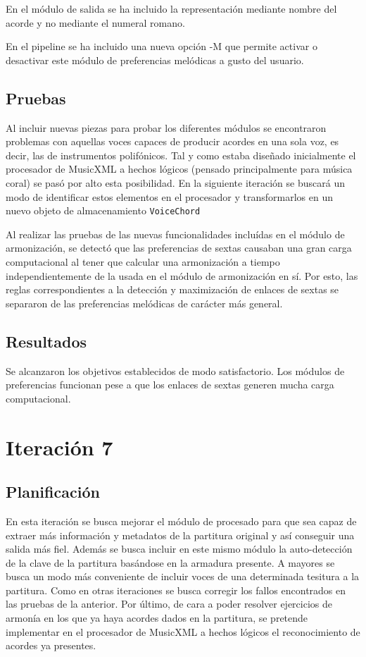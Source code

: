 En el módulo de salida se ha incluido la representación mediante nombre del acorde y no mediante el numeral romano.

En el pipeline se ha incluido una nueva opción -M que permite activar o desactivar este módulo de preferencias melódicas a gusto del usuario. 

\subsection{Pruebas}
Al incluir nuevas piezas para probar los diferentes módulos se encontraron problemas con aquellas voces capaces de producir acordes en una sola voz, es decir, las de instrumentos polifónicos. Tal y como estaba diseñado inicialmente el procesador de MusicXML a hechos lógicos (pensado principalmente para música coral) se pasó por alto esta posibilidad. En la siguiente iteración se buscará un modo de identificar estos elementos en el procesador y transformarlos en un nuevo objeto de almacenamiento \texttt{VoiceChord}

Al realizar las pruebas de las nuevas funcionalidades incluídas en el módulo de armonización, se detectó que las preferencias de sextas causaban una gran carga computacional al tener que calcular una armonización a tiempo independientemente de la usada en el módulo de armonización en sí. Por esto, las reglas correspondientes a la detección y maximización de enlaces de sextas se separaron de las preferencias melódicas de carácter más general. 

\subsection{Resultados}
Se alcanzaron los objetivos establecidos de modo satisfactorio.
Los módulos de preferencias funcionan pese a que los enlaces de sextas generen mucha carga computacional.

\section{Iteración 7}
\subsection{Planificación}
En esta iteración se busca mejorar el módulo de procesado para que sea capaz de extraer más información y metadatos de la partitura original y así conseguir una salida más fiel. Además se busca incluir en este mismo módulo la auto-detección de la clave de la partitura basándose en la armadura presente. A mayores se busca un modo más conveniente de incluir voces de una determinada tesitura a la partitura. Como en otras iteraciones se busca corregir los fallos encontrados en las pruebas de la anterior. Por último, de cara a poder resolver ejercicios de armonía en los que ya haya acordes dados en la partitura, se pretende implementar en el procesador de MusicXML a hechos lógicos el reconocimiento de acordes ya presentes.

